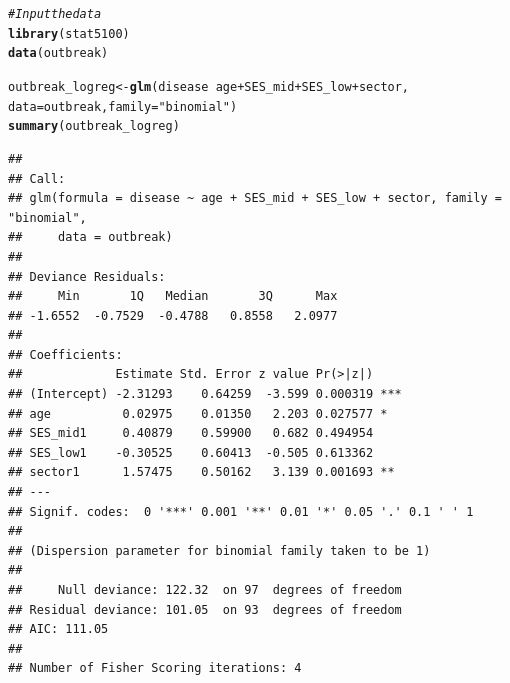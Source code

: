 \documentclass{article}\usepackage[]{graphicx}\usepackage[]{color}
\makeatletter
\newcommand{\hlstr}[1]{\textcolor[rgb]{0.192,0.494,0.8}{#1}}%
\newcommand{\hlcom}[1]{\textcolor[rgb]{0.678,0.584,0.686}{\textit{#1}}}%
\newcommand{\hlopt}[1]{\textcolor[rgb]{0,0,0}{#1}}%
\newcommand{\hlstd}[1]{\textcolor[rgb]{0.345,0.345,0.345}{#1}}%
\newcommand{\hlkwb}[1]{\textcolor[rgb]{0.69,0.353,0.396}{#1}}%
\newcommand{\hlkwc}[1]{\textcolor[rgb]{0.333,0.667,0.333}{#1}}%
\newcommand{\hlkwd}[1]{\textcolor[rgb]{0.737,0.353,0.396}{\textbf{#1}}}%
\newenvironment{kframe}{%
 \def\at@end@of@kframe{}%
 \ifinner\ifhmode%
  \def\at@end@of@kframe{\end{minipage}}%
  \begin{minipage}{\columnwidth}%
 \fi\fi%
 \def\FrameCommand##1{\hskip\@totalleftmargin \hskip-\fboxsep
 \colorbox{shadecolor}{##1}\hskip-\fboxsep
     \hskip-\linewidth \hskip-\@totalleftmargin \hskip\columnwidth}%
 \MakeFramed {\advance\hsize-\width
   \@totalleftmargin\z@ \linewidth\hsize
   \@setminipage}}%
 {\par\unskip\endMakeFramed%
 \at@end@of@kframe}
\newenvironment{knitrout}{}{} %
\makeatother
\begin{document}
\begin{knitrout}
{}



\end{knitrout}

\begin{knitrout}
\color{fgcolor}\begin{kframe}
\begin{alltt}
\hlcom{# Input the data}
\hlkwd{library}\hlstd{(stat5100)}
\hlkwd{data}\hlstd{(outbreak)}

\hlstd{outbreak_logreg} \hlkwb{<-} \hlkwd{glm}\hlstd{(disease} \hlopt{~} \hlstd{age} \hlopt{+} \hlstd{SES_mid} \hlopt{+} \hlstd{SES_low} \hlopt{+} \hlstd{sector,}
                       \hlkwc{data} \hlstd{= outbreak,} \hlkwc{family} \hlstd{=} \hlstr{"binomial"}\hlstd{)}
\hlkwd{summary}\hlstd{(outbreak_logreg)}
\end{alltt}
\begin{verbatim}
## 
## Call:
## glm(formula = disease ~ age + SES_mid + SES_low + sector, family = "binomial", 
##     data = outbreak)
## 
## Deviance Residuals: 
##     Min       1Q   Median       3Q      Max  
## -1.6552  -0.7529  -0.4788   0.8558   2.0977  
## 
## Coefficients:
##             Estimate Std. Error z value Pr(>|z|)    
## (Intercept) -2.31293    0.64259  -3.599 0.000319 ***
## age          0.02975    0.01350   2.203 0.027577 *  
## SES_mid1     0.40879    0.59900   0.682 0.494954    
## SES_low1    -0.30525    0.60413  -0.505 0.613362    
## sector1      1.57475    0.50162   3.139 0.001693 ** 
## ---
## Signif. codes:  0 '***' 0.001 '**' 0.01 '*' 0.05 '.' 0.1 ' ' 1
## 
## (Dispersion parameter for binomial family taken to be 1)
## 
##     Null deviance: 122.32  on 97  degrees of freedom
## Residual deviance: 101.05  on 93  degrees of freedom
## AIC: 111.05
## 
## Number of Fisher Scoring iterations: 4
\end{verbatim}
\end{kframe}
\end{knitrout}
\end{document}

